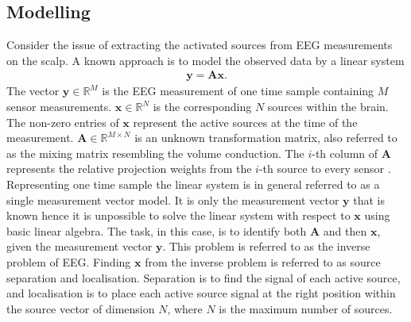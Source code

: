 %     


\subsection{Modelling}
Consider the issue of extracting the activated sources from EEG measurements on the scalp. A known approach is to model the observed data by a linear system 
\begin{align*}
\mathbf{y} = \mathbf{Ax}.
\end{align*}
The vector $\mathbf{y} \in \mathbb{R}^{M}$ is the EEG measurement of one time sample containing $M$ sensor measurements. $\mathbf{x} \in \mathbb{R}^{N}$ is the corresponding $N$ sources within the brain. 
The non-zero entries of $\textbf{x}$ represent the active sources at the time of the measurement. 
$\mathbf{A} \in \mathbb{R}^{M \times N}$ is an unknown transformation matrix, also referred to as the mixing matrix resembling the volume conduction. 
The $i$-th column of $\mathbf{A}$ represents the relative projection weights from the $i$-th source to every sensor \cite{phd2015}. 
Representing one time sample the linear system is in general referred to as a single measurement vector model. 
It is only the measurement vector $\textbf{y}$ that is known hence it is unpossible to solve the linear system with respect to $\textbf{x}$ using basic linear algebra. 
The task, in this case, is to identify both $\mathbf{A}$ and then $\mathbf{x}$, given the measurement vector $\mathbf{y}$. This problem is referred to as the inverse problem of EEG. 
Finding $\textbf{x}$ from the inverse problem is referred to as source separation and localisation. Separation is to find the signal of each active source, and localisation is to place each active source signal at the right position within the source vector of dimension $N$, where $N$ is the maximum number of sources.      

